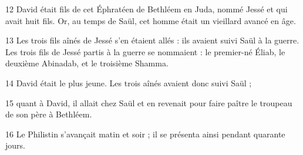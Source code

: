
12 David était fils de cet Éphratéen de Bethléem en Juda, nommé Jessé et qui avait huit fils. Or, au temps de Saül, cet homme était un vieillard avancé en âge.

13 Les trois fils aînés de Jessé s’en étaient allés : ils avaient suivi Saül à la guerre. Les trois fils de Jessé partis à la guerre se nommaient : le premier-né Éliab, le deuxième Abinadab, et le troisième Shamma.

14 David était le plus jeune. Les trois aînés avaient donc suivi Saül ;

15 quant à David, il allait chez Saül et en revenait pour faire paître le troupeau de son père à Bethléem.

16 Le Philistin s’avançait matin et soir ; il se présenta ainsi pendant quarante jours.